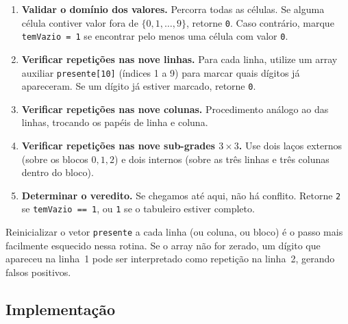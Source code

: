 \documentclass[11pt,a4paper,oneside]{report}
\newcommand{\codigo}[1]{\texttt{\color{deitelblue}#1}}
\begin{document}
\begin{enumerate}
    \item \textbf{Validar o domínio dos valores.} Percorra todas as células.
        Se alguma célula contiver valor fora de $\{0, 1, \ldots, 9\}$,
        retorne \codigo{0}. Caso contrário, marque \codigo{temVazio = 1}
        se encontrar pelo menos uma célula com valor \codigo{0}.
    \item \textbf{Verificar repetições nas nove linhas.} Para cada linha,
        utilize um array auxiliar \codigo{presente[10]} (índices 1 a 9)
        para marcar quais dígitos já apareceram. Se um dígito já estiver
        marcado, retorne \codigo{0}.
    \item \textbf{Verificar repetições nas nove colunas.} Procedimento
        análogo ao das linhas, trocando os papéis de linha e coluna.
    \item \textbf{Verificar repetições nas nove sub-grades $3 \times 3$.}
        Use dois laços externos (sobre os blocos $0,1,2$) e dois internos
        (sobre as três linhas e três colunas dentro do bloco).
    \item \textbf{Determinar o veredito.} Se chegamos até aqui, não há
        conflito. Retorne \codigo{2} se \codigo{temVazio == 1}, ou
        \codigo{1} se o tabuleiro estiver completo.
\end{enumerate}

\begin{boapratica}
Reinicializar o vetor \codigo{presente} a cada linha (ou coluna, ou bloco)
é o passo mais facilmente esquecido nessa rotina. Se o array não for zerado,
um dígito que apareceu na linha~1 pode ser interpretado como repetição na
linha~2, gerando falsos positivos.
\end{boapratica}

\subsection{Implementação}
\end{document}
